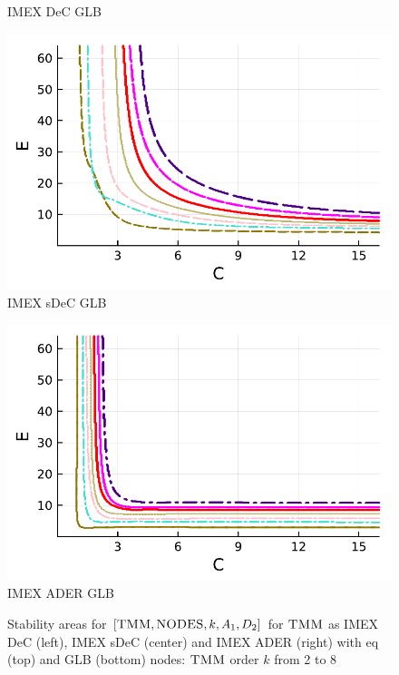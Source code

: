 \begin{figure}
\begin{minipage}[t]{0.32\textwidth}
		\centering
		IMEX DeC GLB
	\end{minipage} 
	\begin{minipage}[t]{0.32\textwidth}
		\includegraphics[width=\textwidth]{pdf/pdepics/diff/IMEXDeC_subtimesteps_gaussLobatto_TMM_ord_2-8.pdf}
		\centering
		IMEX sDeC GLB
	\end{minipage}
	\begin{minipage}[t]{0.32\textwidth}
		\includegraphics[width=\textwidth]{pdf/pdepics/diff/IMEXADER_gaussLobatto_TMM_ord_2-8.pdf}
		\centering
		IMEX ADER GLB
	\end{minipage} 
	\caption{Stability areas for $[\textsc{TMM},\textsc{NODES},k, A_1,D_2]$ for $\textsc{TMM}$ as IMEX DeC (left), IMEX sDeC (center) and IMEX ADER (right) with eq (top) and GLB (bottom) nodes: $\textsc{TMM}$ order $k$ from 2 to 8}
	\label{fig: grp_adv1_diff2}
\end{figure}

